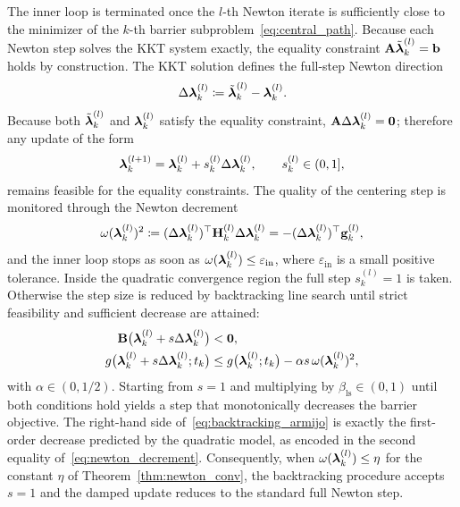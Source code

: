 The inner loop is terminated once the $l$-th Newton iterate is sufficiently close to the minimizer of the $k$-th barrier subproblem~\eqref{eq:central_path}. Because each Newton step solves the KKT system exactly, the equality constraint $\mathbf{A}\tilde{\boldsymbol{\lambda}}_k^{(l)}=\mathbf{b}$ holds by construction. The KKT solution defines the full-step Newton direction
\begin{equation}\label{eq:newton_direction}
	\Delta\boldsymbol{\lambda}_k^{(l)} \coloneqq \tilde{\boldsymbol{\lambda}}_k^{(l)} - \boldsymbol{\lambda}_k^{(l)}.
\end{equation}
Because both $\tilde{\boldsymbol{\lambda}}_k^{(l)}$ and $\boldsymbol{\lambda}_k^{(l)}$ satisfy the equality constraint, $\mathbf{A}\Delta\boldsymbol{\lambda}_k^{(l)}=\mathbf{0}$; therefore any update of the form
\begin{equation}\label{eq:damped_update}
	\boldsymbol{\lambda}_k^{(l+1)} = \boldsymbol{\lambda}_k^{(l)} + s_k^{(l)}\Delta\boldsymbol{\lambda}_k^{(l)},\qquad s_k^{(l)}\in(0,1],
\end{equation}
remains feasible for the equality constraints. The quality of the centering step is monitored through the Newton decrement
\begin{equation}\label{eq:newton_decrement}
	\omega(\boldsymbol{\lambda}_k^{(l)})^2 \coloneqq (\Delta\boldsymbol{\lambda}_k^{(l)})^{\top} \mathbf{H}_k^{(l)} \Delta\boldsymbol{\lambda}_k^{(l)} = -(\Delta\boldsymbol{\lambda}_k^{(l)})^{\top} \mathbf{g}_k^{(l)},
\end{equation}
and the inner loop stops as soon as $\omega(\boldsymbol{\lambda}_k^{(l)})\le\varepsilon_{\text{in}}$, where $\varepsilon_{\text{in}}$ is a small positive tolerance. Inside the quadratic convergence region the full step $s_k^{(l)}=1$ is taken. Otherwise the step size is reduced by backtracking line search until strict feasibility and sufficient decrease are attained:
\begin{subequations}\label{eq:backtracking_conditions}
\begin{align}
	\mathbf{B}\big(\boldsymbol{\lambda}_k^{(l)}+s\Delta\boldsymbol{\lambda}_k^{(l)}\big) &< \mathbf{0}, \label{eq:backtracking_feas}\\
	g\big(\boldsymbol{\lambda}_k^{(l)}+s\Delta\boldsymbol{\lambda}_k^{(l)};t_k\big) &\le g\big(\boldsymbol{\lambda}_k^{(l)};t_k\big) - \alpha s\,\omega(\boldsymbol{\lambda}_k^{(l)})^2, \label{eq:backtracking_armijo}
\end{align}
\end{subequations}
with $\alpha\in(0,1/2)$. Starting from $s=1$ and multiplying by $\beta_\text{ls}\in(0,1)$ until both conditions hold yields a step that monotonically decreases the barrier objective. The right-hand side of~\eqref{eq:backtracking_armijo} is exactly the first-order decrease predicted by the quadratic model, as encoded in the second equality of~\eqref{eq:newton_decrement}. Consequently, when $\omega(\boldsymbol{\lambda}_k^{(l)})\le\eta$ for the constant $\eta$ of Theorem~\ref{thm:newton_conv}, the backtracking procedure accepts $s=1$ and the damped update reduces to the standard full Newton step.

